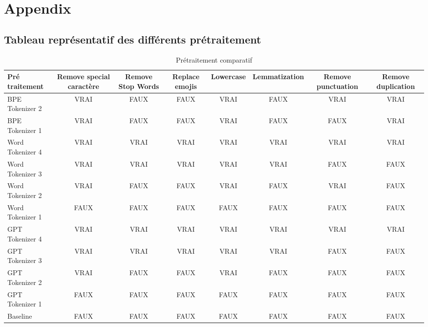 \chapter{Appendix}
\label{chap:appendix_tokenizer}

\section{Tableau représentatif des différents prétraitement}
\begin{table}[ht]
    \centering
    \begin{adjustbox}{max width=\textwidth}
    \renewcommand{\arraystretch}{1.5} %
    \setlength{\tabcolsep}{6pt} %
    \begin{tabular}{|p{3.5cm}|c|c|c|c|c|c|c|}
        \hline
        \textbf{Pré traitement} & \textbf{Remove special caractère} & \textbf{Remove Stop Words} & \textbf{Replace emojis} & \textbf{Lowercase} & \textbf{Lemmatization} & \textbf{Remove punctuation} & \textbf{Remove duplication} \\
        \hline
        BPE Tokenizer 2  & VRAI & FAUX & FAUX & VRAI & FAUX & VRAI & VRAI \\
        BPE Tokenizer 1  & VRAI & FAUX & FAUX & VRAI & FAUX & FAUX & VRAI \\
        Word Tokenizer 4  & VRAI & VRAI & VRAI & VRAI & VRAI & VRAI & VRAI \\
        Word Tokenizer 3 & VRAI & VRAI & VRAI & VRAI & VRAI & FAUX & FAUX \\
        Word Tokenizer 2  & VRAI & FAUX & FAUX & VRAI & FAUX & VRAI & FAUX \\
        Word Tokenizer 1  & FAUX & FAUX & FAUX & FAUX & FAUX & FAUX & FAUX \\
        GPT Tokenizer 4  & VRAI & VRAI & VRAI & VRAI & VRAI & VRAI & VRAI \\
        GPT Tokenizer 3 & VRAI & VRAI & VRAI & VRAI & VRAI & FAUX & FAUX \\
        GPT Tokenizer 2  & VRAI & FAUX & FAUX & VRAI & FAUX & FAUX & FAUX \\
        GPT Tokenizer 1 & FAUX & FAUX & FAUX & FAUX & FAUX & FAUX & FAUX \\
        Baseline & FAUX & FAUX & FAUX & FAUX & FAUX & FAUX & FAUX \\
        \hline
    \end{tabular}
    \end{adjustbox}
    \caption{Prétraitement comparatif}
    \label{tab:pre_treatment_comparative}
\end{table}